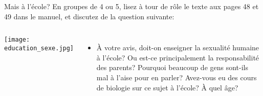 \begin{frame}{Mais à l'école?}
  En groupes de 4 ou 5, lisez à tour de rôle le texte aux pages 48 et 49 dans le manuel, et discutez de la question suivante:
  \begin{columns}
    \begin{center}
      \texttt{[image: education\_sexe.jpg]}
    \end{center}
  \begin{itemize}
    \item À votre avis, doit-on enseigner la sexualité humaine à l'école?
    Ou est-ce principalement la responsabilité des parents?
    Pourquoi beaucoup de gens sont-ils mal à l'aise pour en parler?
    Avez-vous eu des cours de biologie sur ce sujet à l'école?
    À quel âge?
  \end{itemize}
\end{columns}
\end{frame}